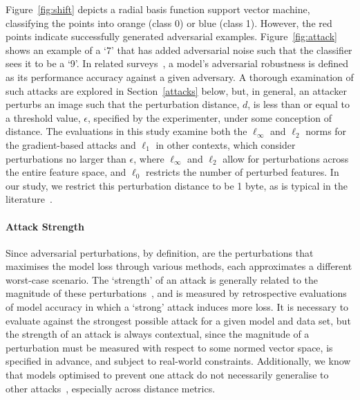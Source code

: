 \documentclass[journal]{IEEEtran}
\begin{document}
Figure~\ref{fig:shift} depicts a radial basis function support vector machine, classifying the points into orange (class 0) or blue (class 1).
However, the red points indicate successfully generated adversarial examples.
Figure~\ref{fig:attack} shows an example of a `7' that has added adversarial noise such that the classifier sees it to be a `9'.
In related surveys~\cite{dohmatob_generalized_2019,biggio_evasion_2013-1,bect_bayesian_2017,chakraborty_adversarial_2018,carlini_towards_2017,croce_reliable_2020}, a model's adversarial robustness is defined as its performance accuracy against a given adversary.
A thorough examination of such attacks are explored in Section~\ref{attacks} below, but, in general, an attacker perturbs an image such that the perturbation distance, $d$, is less than or equal to a threshold value, $\epsilon$, specified by the experimenter, under some conception of distance.
The evaluations in this study examine both the $\ell_{\infty}$ and $\ell_2$ norms for the gradient-based attacks and $\ell_1$ in other contexts, which consider perturbations no larger than $\epsilon$, where $\ell_{\infty}$ and $\ell_2$ allow for perturbations across the entire feature space, and $\ell_0$ restricts the number of perturbed features.
In our study, we restrict this perturbation distance to be 1 byte, as is typical in the literature~\cite{madry2017towards,miller_adversarial_2020,biggio_evasion_2013,biggio_multiple_2009}.

\paragraph{Attack Strength}
 Since adversarial perturbations, by definition, are the perturbations that maximises the model loss through various methods, each approximates a different worst-case scenario.
The `strength' of an attack is generally related to the magnitude of these perturbations~\cite{carlini_towards_2017}, and is measured by retrospective evaluations of model accuracy in which a `strong' attack induces more loss.
It is necessary to evaluate against the strongest possible attack for a given model and data set, but the strength of an attack is always contextual, since the magnitude of a perturbation must be measured with respect to some normed vector space, is specified in advance, and subject to real-world constraints.
Additionally, we know that models optimised to prevent one attack do not necessarily generalise to other attacks~\cite{carlini_towards_2017}, especially across distance metrics.
\end{document}
